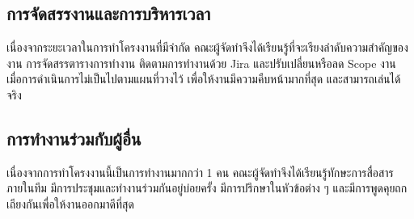 \documentclass[12pt,oneside,openright,a4paper]{cpe-thai-project}
\begin{document}
    \subsection{การจัดสรรงานและการบริหารเวลา}
    เนื่องจากระยะเวลาในการทำโครงงานที่มีจำกัด คณะผู้จัดทำจึงได้เรียนรู้ที่จะเรียงลำดับความสำคัญของงาน 
    การจัดสรรตารางการทำงาน ติดตามการทำงานด้วย Jira และปรับเปลี่ยนหรือลด Scope งาน 
    เมื่อการดำเนินการไม่เป็นไปตามแผนที่วางไว้ เพื่อให้งานมีความคืบหน้ามากที่สุด และสามารถเล่นได้จริง

    \subsection{การทำงานร่วมกับผู้อื่น}
    เนื่องจากการทำโครงงานนี้เป็นการทำงานมากกว่า 1 คน คณะผู้จัดทำจึงได้เรียนรู้ทักษะการสื่อสารภายในทีม 
    มีการประชุมและทำงานร่วมกันอยู่บ่อยครั้ง มีการปรึกษาในหัวข้อต่าง ๆ และมีการพูดคุยถกเถียงกันเพื่อให้งานออกมาดีที่สุด





\makeatletter
\g@addto@macro{\UrlBreaks}{\UrlOrds}
\makeatother





\end{document}
